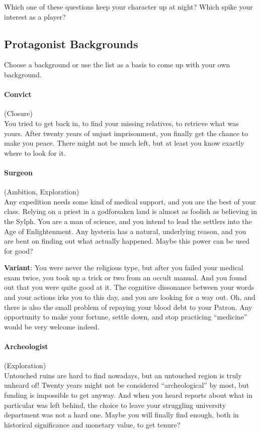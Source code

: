 Which one of these questions keep your character up at night?
Which spike your interest as a player?

\subsection{Protagonist Backgrounds}\label{_character_backgrounds}
Choose a background or use the list as a basis to come up with your own background.

\paragraph{Convict} (Closure) \\
You tried to get back in, to find your missing
relatives, to retrieve what was yours. After twenty years of unjust
imprisonment, you finally get the chance to make you peace. There might
not be much left, but at least you know exactly where to look for it.

\paragraph{Surgeon} (Ambition, Exploration)\\
Any expedition needs some kind of medical support,
and you are the best of your class. Relying on a priest in a godforsaken
land is almost as foolish as believing in the Sylph. You are a man of
science, and you intend to lead the settlers into the Age of
Enlightenment. Any hysteria has a natural, underlying reason, and you
are bent on finding out what actually happened. Maybe this power can be
used for good?

\textbf{Variant}: You were never the religious type, but after you
failed your medical exam twice, you took up a trick or two from an
occult manual. And you found out that you were quite good at it. The
cognitive dissonance between your words and your actions irks you to
this day, and you are looking for a way out. Oh, and there is also the
small problem of repaying your blood debt to your Patron. Any
opportunity to make your fortune, settle down, and stop practicing
``medicine'' would be very welcome indeed.

\paragraph{Archeologist}
(Exploration)\\
Untouched ruins are hard to find nowadays, but an
untouched region is truly unheard of! Twenty years might not be
considered ``archeological'' by most, but funding is impossible to get
anyway. And when you heard reports about what in particular was left
behind, the choice to leave your struggling university department was
not a hard one. Maybe you will finally find enough, both in historical
significance and monetary value, to get tenure?

